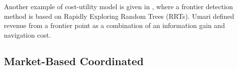 Another example of cost-utility model is given in \cite{Umari2017}, where a frontier detection method is based on Rapidly Exploring Random Trees (RRTs). Umari defined revenue from a frontier point as a combination of an information gain and navigation cost. 


\subsection{Market-Based Coordinated}

